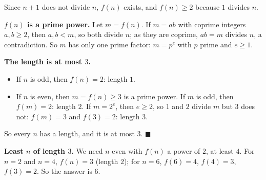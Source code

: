 Since $n+1$ does not divide $n$, $f(n)$ exists, and $f(n)\ge2$ because $1$ divides $n$.

\textbf{$f(n)$ is a prime power.} Let $m=f(n)$. If $m=ab$ with coprime integers $a,b\ge2$, then $a,b<m$, so both divide $n$; as they are coprime, $ab=m$ divides $n$, a contradiction. So $m$ has only one prime factor: $m=p^e$ with $p$ prime and $e\ge1$.

\textbf{The length is at most $3$.}
\begin{itemize}
\item If $n$ is odd, then $f(n)=2$: length $1$.
\item If $n$ is even, then $m=f(n)\ge3$ is a prime power. If $m$ is odd, then $f(m)=2$: length $2$. If $m=2^e$, then $e\ge2$, so $1$ and $2$ divide $m$ but $3$ does not: $f(m)=3$ and $f(3)=2$: length $3$.
\end{itemize}
So every $n$ has a length, and it is at most $3$. $\blacksquare$

\textbf{Least $n$ of length $3$.} We need $n$ even with $f(n)$ a power of $2$, at least $4$. For $n=2$ and $n=4$, $f(n)=3$ (length $2$); for $n=6$, $f(6)=4$, $f(4)=3$, $f(3)=2$. So the answer is $\boxed{6}$.
